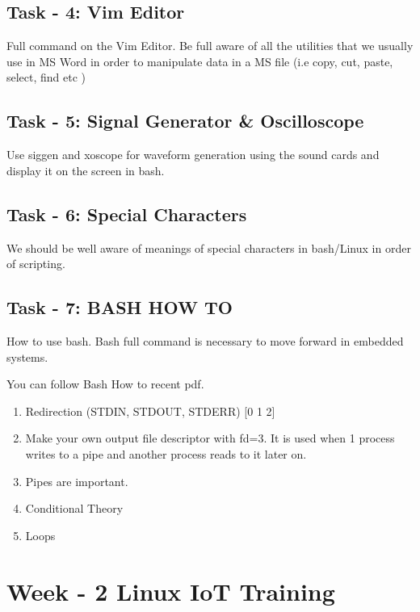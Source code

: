 \documentclass[letterpaper,10pt,english]{sphinxmanual}
\begin{document}
\section{Task - 4: Vim Editor}
\label{week-01:task-4-vim-editor}
Full command on the Vim Editor. Be full aware of all the utilities that we usually use in MS Word in order to manipulate data in a MS file (i.e copy, cut, paste, select, find etc )


\section{Task - 5: Signal Generator \& Oscilloscope}
\label{week-01:task-5-signal-generator-oscilloscope}
Use siggen and xoscope for waveform generation using the sound cards and display it on the screen in bash.


\section{Task - 6: Special Characters}
\label{week-01:task-6-special-characters}
We should be well aware of meanings of special characters in bash/Linux in order of scripting.


\section{Task - 7: BASH HOW TO}
\label{week-01:task-7-bash-how-to}
How to use bash. Bash full command is necessary to move forward in embedded systems.

You can follow Bash How to recent pdf.
\begin{enumerate}
\item {} 
Redirection (STDIN, STDOUT, STDERR) {[}0 1 2{]}

\item {} 
Make your own output file descriptor with fd=3. It is used when 1 process writes to a pipe and another process reads to it later on.

\item {} 
Pipes are important.

\item {} 
Conditional Theory

\item {} 
Loops

\end{enumerate}


\chapter{Week - 2 Linux IoT Training}
\label{week-02:week-02}\label{week-02::doc}\label{week-02:week-2-linux-iot-training}
\end{document}
